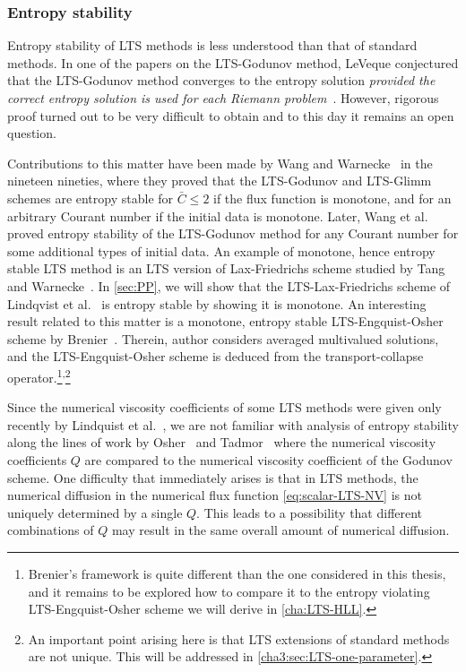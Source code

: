 \subsubsection*{Entropy stability}
\label{sec:LTS-entropy-stability}

Entropy stability of LTS methods is less understood than that of standard methods. In one of the papers on the LTS-Godunov method, LeVeque conjectured that the LTS-Godunov method converges to the entropy solution \textit{provided the correct entropy solution is used for each Riemann problem}~\cite{lev84}. However, rigorous proof turned out to be very difficult to obtain and to this day it remains an open question.

Contributions to this matter have been made by Wang and Warnecke~\cite{wan93a,wan93b} in the nineteen nineties, where they proved that the LTS-Godunov and LTS-Glimm schemes are entropy stable for $ \bar{C} \leq 2 $ if the flux function is monotone, and for an arbitrary Courant number if the initial data is monotone. Later, Wang et al.~\cite{wan04} proved entropy stability of the LTS-Godunov method for any Courant number for some additional types of initial data. An example of monotone, hence entropy stable LTS method is an LTS version of Lax-Friedrichs scheme studied by Tang and Warnecke~\cite{tan04}. In \cref{sec:PP}, we will show that the LTS-Lax-Friedrichs scheme of Lindqvist et al.~\cite{lin16} is entropy stable by showing it is monotone. An interesting result related to this matter is a monotone, entropy stable LTS-Engquist-Osher scheme by Brenier~\cite{bre84}. Therein, author considers averaged multivalued solutions, and the LTS-Engquist-Osher scheme is deduced from the transport-collapse operator.\footnote{Brenier's framework is quite different than the one considered in this thesis, and it remains to be explored how to compare it to the entropy violating LTS-Engquist-Osher scheme we will derive in \cref{cha:LTS-HLL}.}\textsuperscript{,}\footnote{An important point arising here is that LTS extensions of standard methods are not unique. This will be addressed in \cref{cha3:sec:LTS-one-parameter}.}

Since the numerical viscosity coefficients of some LTS methods were given only recently by Lindquist et al.~\cite{lin16}, we are not familiar with analysis of entropy stability along the lines of work by Osher~\cite{osh84} and Tadmor~\cite{tad84} where the numerical viscosity coefficients $ Q $ are compared to the numerical viscosity coefficient of the Godunov scheme. One difficulty that immediately arises is that in LTS methods, the numerical diffusion in the numerical flux function \eqref{eq:scalar-LTS-NV} is not uniquely determined by a single $ Q $. This leads to a possibility that different combinations of $ Q $ may result in the same overall amount of numerical diffusion.

